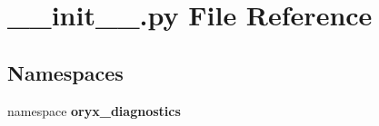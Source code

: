 \section{\-\_\-\-\_\-init\-\_\-\-\_\-.\-py \-File \-Reference}
\label{____init_____8py}
\subsection*{\-Namespaces}
\begin{DoxyCompactItemize}
\item 
namespace {\bf oryx\-\_\-diagnostics}
\end{DoxyCompactItemize}
